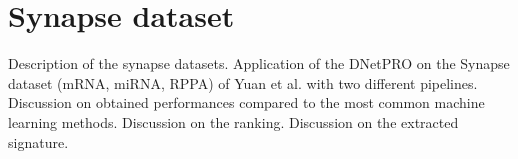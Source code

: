 \documentclass{standalone}
\begin{document}
\section[Synapse Dataset]{Synapse dataset}\label{synapse}

Description of the synapse datasets.
Application of the DNetPRO on the Synapse dataset (mRNA, miRNA, RPPA) of Yuan et al. with two different pipelines.
Discussion on obtained performances compared to the most common machine learning methods.
Discussion on the ranking.
Discussion on the extracted signature.
\end{document}
